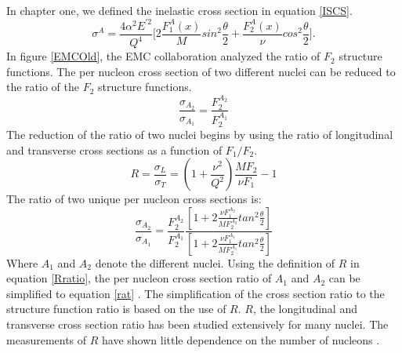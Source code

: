 \paragraph{}In chapter one, we defined the inelastic cross section in equation \ref{ISCS}.  
\begin{equation}
\label{ISCSch2}
\sigma^A=\frac{4\alpha^2E^{\prime 2}}{Q^4} \bigg\lbrack 2\frac{F_1^A(x)}{M}sin^2\frac{\theta}{2} + \frac{F_2^A(x)}{\nu}cos^2\frac{\theta}{2} \bigg \rbrack.
\end{equation} 
In figure \ref{EMCOld}, the EMC collaboration analyzed the ratio of $F_2$ structure functions. The per nucleon cross section of two different nuclei can be reduced to the ratio of the $F_2$ structure functions.  
\begin{equation}
\label{rat}
\frac{\sigma_{A_2}}{\sigma_{A_1}} = \frac{F_2^{A_2}}{F_2^{A_1}}
\end{equation}
The reduction of the ratio of two nuclei begins by using the ratio of longitudinal and transverse cross sections as a function of $F_1/F_2$.
\begin{equation}
R=\frac{\sigma_{L}}{\sigma_{T}} =\left(1+\frac{\nu^2}{Q^2} \right)\frac{MF_2}{\nu F_1} -1
\label{Rratio}
\end{equation}
The ratio of two unique per nucleon cross sections is:
\begin{equation}
\label{Aratio}
\frac{\sigma_{A_2}}{\sigma_{A_1}} = \frac{F_2^{A_2}}{F_2^{A_1}} \frac{\left[1+ 2\frac{\nu F_1^{A_2} }{MF_2^{A_2}} tan^2\frac{\theta}{2} \right]}{\left[1+ 2\frac{\nu F_1^{A_1} }{MF_2^{A_1}} tan^2\frac{\theta}{2} \right]}
\end{equation}
Where $A_1$ and $A_2$ denote the different nuclei. Using the definition of $R$ in equation \ref{Rratio}, the per nucleon cross section ratio of $A_1$ and $A_2$ can be simplified to equation \ref{rat} \cite{EM,seelyth}. The simplification of the cross section ratio to the structure function ratio is based on the use of $R$. $R$, the longitudinal and transverse cross section ratio has been studied extensively for many nuclei. The measurements of $R$ have shown little dependence on the number of nucleons \cite{EM}. 
